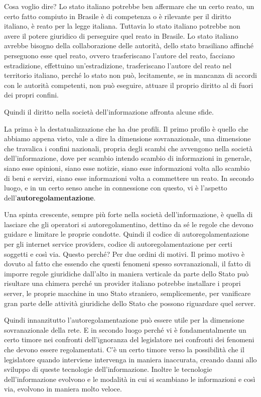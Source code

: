 Cosa voglio dire? Lo stato italiano potrebbe ben affermare che un certo reato, un certo fatto compiuto in Brasile è di competenza o è rilevante per il diritto italiano, è reato per la legge italiana. Tuttavia lo stato italiano potrebbe non avere il potere giuridico di perseguire quel reato in Brasile. Lo stato italiano avrebbe bisogno della collaborazione delle autorità, dello stato brasiliano affinché perseguono esse quel reato, ovvero trasferiscano l'autore del reato, facciano estradizione, effettuino un'estradizione, trasferiscano l'autore del reato nel territorio italiano, perché lo stato non può, lecitamente, se in mancanza di accordi con le autorità competenti, non può eseguire, attuare il proprio diritto al di fuori dei propri confini.\par  
Quindi il diritto nella società dell'informazione affronta alcune sfide. \par 
La prima è la destatualizzazione che ha due profili. Il primo profilo è quello che abbiamo appena visto, vale a dire la dimensione sovranazionale, una dimensione che travalica i confini nazionali, propria degli scambi che avvengono nella società dell'informazione, dove per scambio intendo scambio di informazioni in generale, siano esse opinioni, siano esse notizie, siano esse informazioni volta allo scambio di beni e servizi, siano esse informazioni volta a commettere un reato. In secondo luogo, e in un certo senso anche in connessione con questo, vi è l'aspetto dell'\textbf{autoregolamentazione}. \par
Una spinta crescente, sempre più forte nella società dell'informazione, è quella di lasciare che gli operatori si autoregolamentino, dettino da sé le regole che devono guidare e limitare le proprie condotte. Quindi il codice di autoregolamentazione per gli internet service providers, codice di autoregolamentazione per certi soggetti e così via. Questo perché? Per due ordini di motivi. Il primo motivo è dovuto al fatto che essendo che questi fenomeni spesso sovranazionali, il fatto di imporre regole giuridiche dall'alto in maniera verticale da parte dello Stato può risultare una chimera perché un provider italiano potrebbe installare i propri server, le proprie macchine in uno Stato straniero, semplicemente, per vanificare gran parte delle attività giuridiche dello Stato che possono riguardare quel server.\par
Quindi innanzitutto l'autoregolamentazione può essere utile per la dimensione sovranazionale della rete. E in secondo luogo perché vi è fondamentalmente un certo timore nei confronti dell'ignoranza del legislatore nei confronti dei fenomeni che devono essere regolamentati. C'è un certo timore verso la possibilità che il legislatore quando interviene intervenga in maniera inaccurata, creando danni allo sviluppo di queste tecnologie dell'informazione. Inoltre le tecnologie dell'informazione evolvono e le modalità in cui si scambiano le informazioni e così via, evolvono in maniera molto veloce. \par

